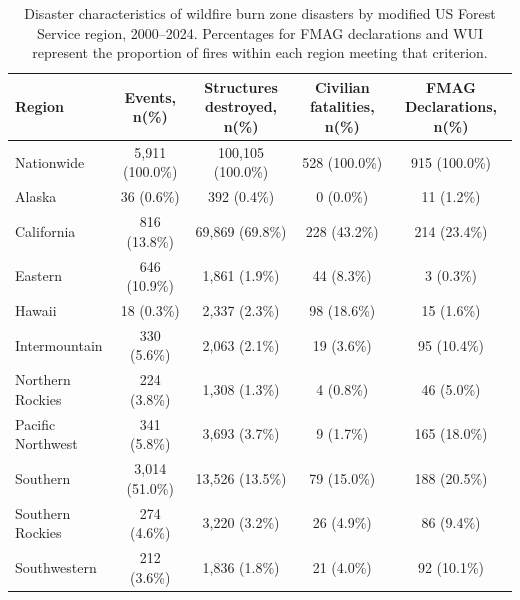 \begin{table}[H]
\fontsize{6.0pt}{7.2pt}\selectfont
\begin{tabular*}{\linewidth}{@{\extracolsep{\fill}}lcccc}
\toprule
Region & Events, n(\%) & Structures destroyed, n(\%) & Civilian fatalities, n(\%) & FMAG Declarations, n(\%) \\ 
\midrule\addlinespace[2.5pt]
Nationwide & 5,911 (100.0\%) & 100,105 (100.0\%) & 528 (100.0\%) & 915 (100.0\%) \\ 
Alaska & 36 (0.6\%) & 392 (0.4\%) & 0 (0.0\%) & 11 (1.2\%) \\ 
California & 816 (13.8\%) & 69,869 (69.8\%) & 228 (43.2\%) & 214 (23.4\%) \\ 
Eastern & 646 (10.9\%) & 1,861 (1.9\%) & 44 (8.3\%) & 3 (0.3\%) \\ 
Hawaii & 18 (0.3\%) & 2,337 (2.3\%) & 98 (18.6\%) & 15 (1.6\%) \\ 
Intermountain & 330 (5.6\%) & 2,063 (2.1\%) & 19 (3.6\%) & 95 (10.4\%) \\ 
Northern Rockies & 224 (3.8\%) & 1,308 (1.3\%) & 4 (0.8\%) & 46 (5.0\%) \\ 
Pacific Northwest & 341 (5.8\%) & 3,693 (3.7\%) & 9 (1.7\%) & 165 (18.0\%) \\ 
Southern & 3,014 (51.0\%) & 13,526 (13.5\%) & 79 (15.0\%) & 188 (20.5\%) \\ 
Southern Rockies & 274 (4.6\%) & 3,220 (3.2\%) & 26 (4.9\%) & 86 (9.4\%) \\ 
Southwestern & 212 (3.6\%) & 1,836 (1.8\%) & 21 (4.0\%) & 92 (10.1\%) \\ 
\bottomrule
\end{tabular*}
\caption{Disaster characteristics of wildfire burn zone disasters by modified US Forest Service region, 2000--2024. Percentages for FMAG declarations and WUI represent the proportion of fires within each region meeting that criterion.}
\label{tab:wfbz_criteria}
\end{table}

